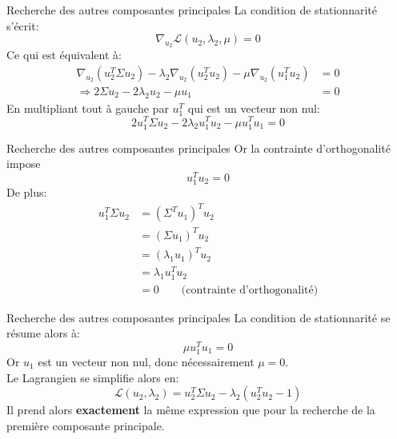 \begin{frame}{Recherche des autres composantes principales}
	La condition de stationnarité s'écrit:
	\begin{equation}
		\nabla_{u_2} \mathcal{L}(u_2, \lambda_2, \mu) = 0 
		\nonumber
	\end{equation}
	\pause
	Ce qui est équivalent à:
	\begin{equation}
		\begin{aligned}
			\nabla_{u_2}\left(u_2^T \Sigma u_2\right) - \lambda_2 \nabla_{u_2}\left(u_2^T u_2\right) - \mu \nabla_{u_2}\left(u_1^T u_2\right) &= 0 \\
			\Rightarrow 2 \Sigma u_2 - 2 \lambda_2 u_2 - \mu u_1 &= 0
		\end{aligned}
		\nonumber
	\end{equation}
	\pause
	En multipliant tout à gauche par $u_1^T$ qui est un vecteur non nul:
	\begin{equation}
		2 u_1^T \Sigma u_2 - 2 \lambda_2 u_1^T u_2 - \mu u_1^T u_1 = 0
		\nonumber
	\end{equation}
\end{frame}

\begin{frame}{Recherche des autres composantes principales}
	Or la contrainte d'orthogonalité impose
	\begin{equation}
		u_1^T u_2 = 0 
		\nonumber
	\end{equation}
	\pause
	De plus:
	\begin{equation}
		\begin{aligned}
			u_1^T \Sigma u_2 
			&= \left(\Sigma^T u_1\right)^T u_2 \\
			&= \left(\Sigma u_1\right)^T u_2 \\
			&= \left(\lambda_1 u_1\right)^T u_2 \\
			&= \lambda_1 u_1^T u_2 \\
			&= 0 \quad \quad \text{(contrainte d'orthogonalité)}
		\end{aligned}
		\nonumber
	\end{equation}
\end{frame}

\begin{frame}{Recherche des autres composantes principales}
	La condition de stationnarité se résume alors à:
	\begin{equation}
		\mu u_1^T u_1 = 0
		\nonumber
	\end{equation}
	Or $u_1$ est un vecteur non nul, donc nécessairement $\mu = 0$. \\
	\pause
	\vspace{0.5cm}
	Le Lagrangien se simplifie alors en:
	\begin{equation}
		\mathcal{L}(u_2, \lambda_2) = u_2^T \Sigma u_2 - \lambda_2 \left(u_2^T u_2 - 1\right)
		\nonumber
	\end{equation}
	\pause
	Il prend alors \textbf{exactement} la même expression que pour la recherche de la première composante principale.
\end{frame}

